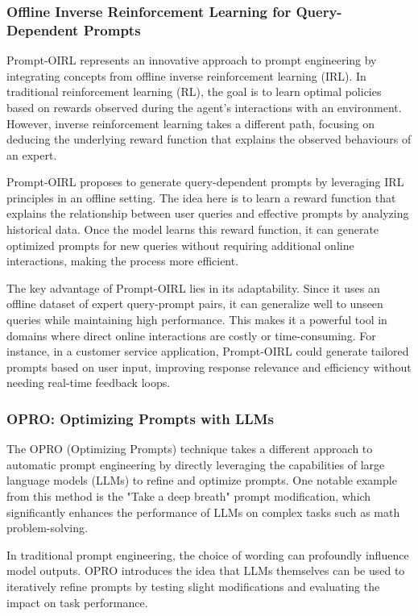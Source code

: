 \subsubsection{Offline Inverse Reinforcement Learning for Query-Dependent Prompts}

Prompt-OIRL \cite{sun2024querydependentpromptevaluationoptimization} represents an innovative approach to prompt engineering by integrating concepts from offline inverse reinforcement learning (IRL). In traditional reinforcement learning (RL), the goal is to learn optimal policies based on rewards observed during the agent's interactions with an environment. However, inverse reinforcement learning takes a different path, focusing on deducing the underlying reward function that explains the observed behaviours of an expert.

Prompt-OIRL proposes to generate query-dependent prompts by leveraging IRL principles in an offline setting. The idea here is to learn a reward function that explains the relationship between user queries and effective prompts by analyzing historical data. Once the model learns this reward function, it can generate optimized prompts for new queries without requiring additional online interactions, making the process more efficient.

The key advantage of Prompt-OIRL lies in its adaptability. Since it uses an offline dataset of expert query-prompt pairs, it can generalize well to unseen queries while maintaining high performance. This makes it a powerful tool in domains where direct online interactions are costly or time-consuming. For instance, in a customer service application, Prompt-OIRL could generate tailored prompts based on user input, improving response relevance and efficiency without needing real-time feedback loops.

\subsubsection{OPRO: Optimizing Prompts with LLMs}

The OPRO (Optimizing Prompts) technique takes a different approach to automatic prompt engineering by directly leveraging the capabilities of large language models (LLMs) to refine and optimize prompts. One notable example from this method is the "Take a deep breath" prompt modification, which significantly enhances the performance of LLMs on complex tasks such as math problem-solving.

In traditional prompt engineering, the choice of wording can profoundly influence model outputs. OPRO introduces the idea that LLMs themselves can be used to iteratively refine prompts by testing slight modifications and evaluating the impact on task performance.

